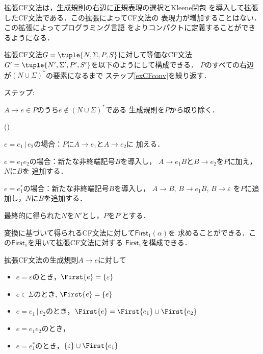 \documentclass[a4j,dvipdfmx]{jbook}
\begin{document}
拡張CF文法は，生成規則の右辺に正規表現の選択とKleene閉包
を導入して拡張したCF文法である．この拡張によってCF文法の
表現力が増加することはない．この拡張によってプログラミング言語
をよりコンパクトに定義することができるようになる．

\begin{Alg}
  拡張CF文法$G=\tuple{N,\Sigma,P,S}$に対して等価なCF文法$G'=
  \tuple{N',\Sigma',P',S'}$を以下のようにして構成できる．
  $P$のすべての右辺が$(N\cup\Sigma)^\ast$の要素になるまで
  ステップ\ref{exCFconv}を繰り返す．
  \begin{list}{ステップ:}{}
    \item\label{exCFconv} $A\rightarrow e\in P$のうち$e\notin(N\cup\Sigma)^\ast$である
    生成規則を$P$から取り除く．
    \begin{list}{()}{}
      \item $e=e_1\,|\,e_2$の場合：$P$に$A\rightarrow e_1$と$A\rightarrow e_2$に
      加える．
      \item $e=e_1e_2$の場合：新たな非終端記号$B$を導入し，
      $A\rightarrow e_1B$と$B\rightarrow e_2$を$P$に加え，$N$に$B$を
      追加する．
      \item $e=e_1^\ast$の場合：新たな非終端記号$B$を導入し，
      $A\rightarrow B$, $B\rightarrow e_1B$, $B\rightarrow\varepsilon$
      を$P$に追加し，$N$に$B$を追加する．
    \end{list}
  \end{list}
  最終的に得られた$N$を$N'$とし，$P$を$P'$とする．
\end{Alg}

変換に基づいて得られるCF文法に対して$\mathsf{First}_1(\alpha)$を
求めることができる．この$\mathsf{First}_1$を用いて拡張CF文法に対する
$\mathsf{First}_1$を構成できる．

\begin{Def}
  拡張CF文法の生成規則$A\rightarrow e$に対して
  \begin{itemize}
    \item $e=\varepsilon$のとき，$\First{e}=\{\varepsilon\}$
    \item $e\in\Sigma$のとき, $\First{e}=\{e\}$
    \item $e=e_1\,|\,e_2$のとき，$\First{e}=\First{e_1}\cup\First{e_2}$
    \item $e=e_1 e_2$のとき，
    \item $e=e_1^\ast$のとき，$\{\varepsilon\}\cup\First{e_1}$
  \end{itemize}
\end{Def}
\end{document}

